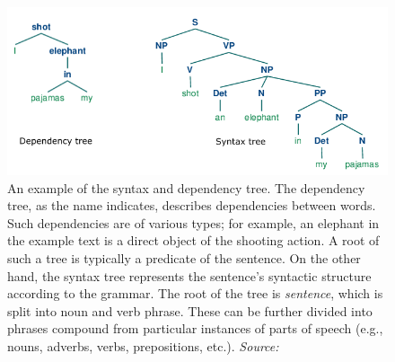\begin{figure}[ht]
\centering
\includegraphics[width=1\textwidth]{../img/syntax_depedency_trees.png}
\caption{
An example of the syntax and dependency tree. The dependency tree, as the name indicates, describes dependencies between words. Such dependencies are of various types; for example, an elephant in the example text is a direct object of the shooting action. A root of such a tree is typically a predicate of the sentence. On the other hand, the syntax tree represents the sentence's syntactic structure according to the grammar. The root of the tree is \textit{sentence}, which is split into noun and verb phrase. These can be further divided into phrases compound from particular instances of parts of speech (e.g., nouns, adverbs, verbs, prepositions, etc.).
\newline \textit{Source: \cite{NLTKbook}}}
\label{fig:trees}
\end{figure}

